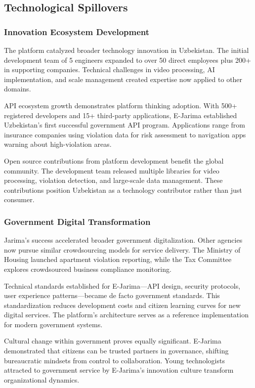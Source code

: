 \documentclass[pdflatex,sn-mathphys-num]{sn-jnl}%
\theoremstyle{thmstyleone}%
\theoremstyle{thmstyletwo}%
\theoremstyle{thmstylethree}%
\begin{document}
\subsection{Technological Spillovers}\label{subsec19}

\subsubsection{Innovation Ecosystem Development}

The platform catalyzed broader technology innovation in Uzbekistan. The initial development team of 5 engineers expanded to over 50 direct employees plus 200+ in supporting companies. Technical challenges in video processing, AI implementation, and scale management created expertise now applied to other domains.

API ecosystem growth demonstrates platform thinking adoption. With 500+ registered developers and 15+ third-party applications, E-Jarima established Uzbekistan's first successful government API program. Applications range from insurance companies using violation data for risk assessment to navigation apps warning about high-violation areas.

Open source contributions from platform development benefit the global community. The development team released multiple libraries for video processing, violation detection, and large-scale data management. These contributions position Uzbekistan as a technology contributor rather than just consumer.

\subsubsection{Government Digital Transformation}

Jarima's success accelerated broader government digitalization. Other agencies now pursue similar crowdsourcing models for service delivery. The Ministry of Housing launched apartment violation reporting, while the Tax Committee explores crowdsourced business compliance monitoring.

Technical standards established for E-Jarima—API design, security protocols, user experience patterns—became de facto government standards. This standardization reduces development costs and citizen learning curves for new digital services. The platform's architecture serves as a reference implementation for modern government systems.

Cultural change within government proves equally significant. E-Jarima demonstrated that citizens can be trusted partners in governance, shifting bureaucratic mindsets from control to collaboration. Young technologists attracted to government service by E-Jarima's innovation culture transform organizational dynamics.
\end{document}
